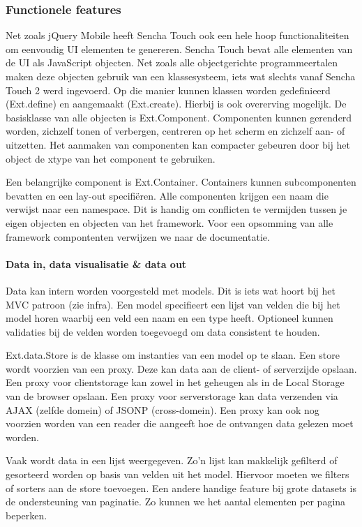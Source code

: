 \subsubsection{Functionele features}
Net zoals jQuery Mobile heeft Sencha Touch ook een hele hoop functionaliteiten om eenvoudig UI elementen te genereren.  Sencha Touch bevat alle elementen van de UI als JavaScript objecten.  Net zoals alle objectgerichte programmeertalen maken deze objecten gebruik van een klassesysteem,  iets wat slechts vanaf Sencha Touch 2 werd ingevoerd.  Op die manier kunnen klassen worden gedefinieerd (Ext.define) en aangemaakt (Ext.create).  Hierbij is ook overerving mogelijk.  De basisklasse van alle objecten is Ext.Component.  Componenten kunnen gerenderd worden, zichzelf tonen of verbergen,  centreren op het scherm en zichzelf aan- of uitzetten.   Het aanmaken van componenten kan compacter gebeuren door bij het object de xtype van het component te gebruiken.  

Een belangrijke component is Ext.Container.  Containers kunnen subcomponenten bevatten en een lay-out specifiëren.  Alle componenten krijgen een naam die verwijst naar een namespace.  Dit is handig om conflicten te vermijden tussen je eigen objecten en objecten van het framework.  Voor een opsomming van alle framework compontenten verwijzen we naar de documentatie.

\paragraph{Data in, data visualisatie \& data out}
Data kan intern worden voorgesteld met models.  Dit is iets wat hoort bij het MVC patroon (zie infra).  Een model specifieert een lijst van velden die bij het model horen waarbij een veld een naam en een type heeft.  Optioneel kunnen validaties bij de velden worden toegevoegd om data consistent te houden.  

Ext.data.Store is de klasse om instanties van een model op te slaan.  Een store wordt voorzien van een proxy.  Deze kan data aan de client- of serverzijde opslaan.  Een proxy voor clientstorage kan zowel in het geheugen als in de Local Storage van de browser opslaan.  Een proxy voor serverstorage kan data verzenden via AJAX (zelfde domein) of JSONP (cross-domein).  Een proxy kan ook nog voorzien worden van een reader die aangeeft hoe de ontvangen data gelezen moet worden.

Vaak wordt data in een lijst weergegeven.  Zo'n lijst kan makkelijk gefilterd of gesorteerd worden op basis van velden uit het model.  Hiervoor moeten we filters of sorters aan de store toevoegen.  Een andere handige feature bij grote datasets is de ondersteuning van paginatie.  Zo kunnen we het aantal elementen per pagina beperken.  

